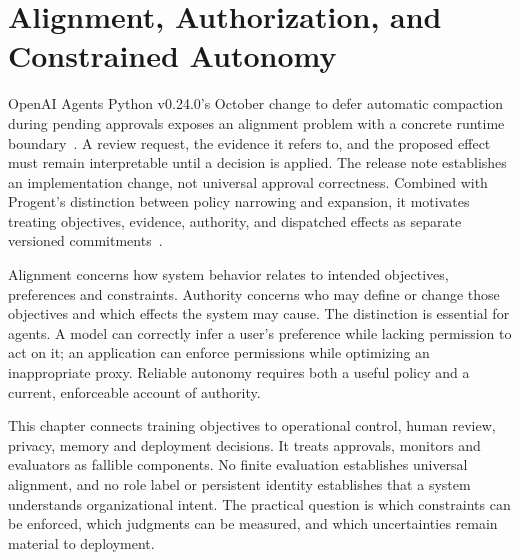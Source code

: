\chapter{Alignment, Authorization, and Constrained Autonomy}\label{ch:C29}
OpenAI Agents Python v0.24.0's October change to defer automatic compaction during pending approvals exposes an alignment problem with a concrete runtime boundary~\cite{executionrelease02}. A review request, the evidence it refers to, and the proposed effect must remain interpretable until a decision is applied. The release note establishes an implementation change, not universal approval correctness. Combined with Progent's distinction between policy narrowing and expansion, it motivates treating objectives, evidence, authority, and dispatched effects as separate versioned commitments~\cite{corpus250411703}.

Alignment concerns how system behavior relates to intended objectives, preferences and constraints. Authority concerns who may define or change those objectives and which effects the system may cause. The distinction is essential for agents. A model can correctly infer a user's preference while lacking permission to act on it; an application can enforce permissions while optimizing an inappropriate proxy. Reliable autonomy requires both a useful policy and a current, enforceable account of authority.

This chapter connects training objectives to operational control, human review, privacy, memory and deployment decisions. It treats approvals, monitors and evaluators as fallible components. No finite evaluation establishes universal alignment, and no role label or persistent identity establishes that a system understands organizational intent. The practical question is which constraints can be enforced, which judgments can be measured, and which uncertainties remain material to deployment.









